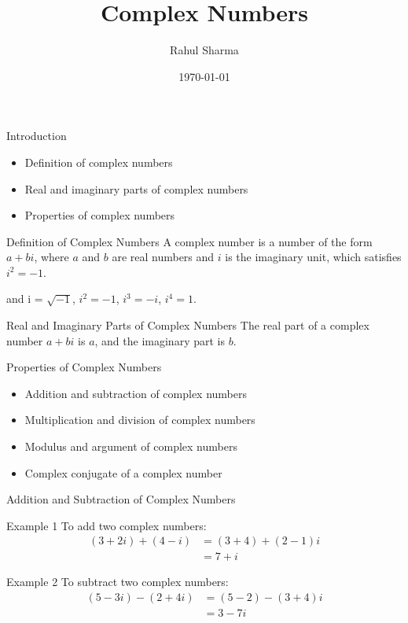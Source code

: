 \documentclass{beamer}
\title{Complex Numbers}
\author{Rahul Sharma}
\institute{Shyam Lal College}
\date{\today}
\begin{document}
\begin{frame}
\titlepage
\end{frame}

\begin{frame}{Introduction}
    \begin{itemize}
        \item Definition of complex numbers
        \item Real and imaginary parts of complex numbers
        \item Properties of complex numbers
    \end{itemize}
\end{frame}

\begin{frame}{Definition of Complex Numbers}
    A complex number is a number of the form $a + bi$, where $a$ and $b$ are real numbers and $i$ is the imaginary unit, which satisfies $i^2 = -1$.

    and i = $\sqrt{-1}$,
        $i^2 = -1$,
        $i^3 = -i$,
        $i^4 = 1$.
\end{frame}

\begin{frame}{Real and Imaginary Parts of Complex Numbers}
    The real part of a complex number $a + bi$ is $a$, and the imaginary part is $b$.
\end{frame}

\begin{frame}{Properties of Complex Numbers}
    \begin{itemize}
        \item Addition and subtraction of complex numbers
        \item Multiplication and division of complex numbers
        \item Modulus and argument of complex numbers
        \item Complex conjugate of a complex number
    \end{itemize}
\end{frame}

\begin{frame}{Addition and Subtraction of Complex Numbers}
    \begin{block}{Example 1}
        To add two complex numbers:
        \begin{align*}
            (3 + 2i) + (4 - i) &= (3 + 4) + (2 - 1)i \\
            &= 7 + i
        \end{align*}
    \end{block}
    \begin{block}{Example 2}
        To subtract two complex numbers:
        \begin{align*}
            (5 - 3i) - (2 + 4i) &= (5 - 2) - (3 + 4)i \\
            &= 3 - 7i
        \end{align*}
    \end{block}
\end{frame}
\end{document}
